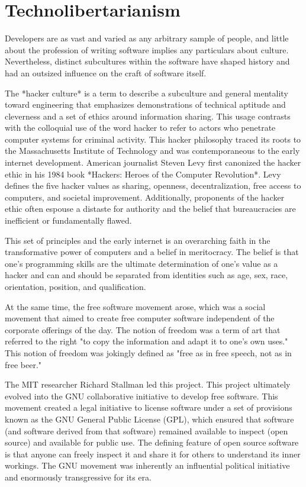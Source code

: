 \section{Technolibertarianism}

Developers are as vast and varied as any arbitrary sample of people, and little
about the profession of writing software implies any particulars about culture.
Nevertheless, distinct subcultures within the software have shaped history and
had an outsized influence on the craft of software itself.

The *hacker culture* is a term to describe a subculture and general mentality
toward engineering that emphasizes demonstrations of technical aptitude and
cleverness and a set of ethics around information sharing. This usage contrasts
with the colloquial use of the word hacker to refer to actors who penetrate
computer systems for criminal activity. This hacker philosophy traced its roots
to the Massachusetts Institute of Technology and was contemporaneous to the
early internet development. American journalist Steven Levy first canonized the
hacker ethic in his 1984 book *Hackers: Heroes of the Computer Revolution*. Levy
defines the five hacker values as sharing, openness, decentralization, free
access to computers, and societal improvement. Additionally, proponents of the
hacker ethic often espouse a distaste for authority and the belief that
bureaucracies are inefficient or fundamentally flawed.

This set of principles and the early internet is an overarching faith in the
transformative power of computers and a belief in meritocracy. The belief is
that one's programming skills are the ultimate determination of one's value as a
hacker and can and should be separated from identities such as age, sex, race,
orientation, position, and qualification.

At the same time, the free software movement arose, which was a social movement
that aimed to create free computer software independent of the corporate
offerings of the day. The notion of freedom was a term of art that referred to
the right "to copy the information and adapt it to one's own uses." This notion
of freedom was jokingly defined as "free as in free speech, not as in free
beer."

The MIT researcher Richard Stallman led this project. This project ultimately
evolved into the GNU collaborative initiative to develop free software. This
movement created a legal initiative to license software under a set of
provisions known as the GNU General Public License (GPL), which ensured that
software (and software derived from that software) remained available to inspect
(open source) and available for public use. The defining feature of open source
software is that anyone can freely inspect it and share it for others to
understand its inner workings. The GNU movement was inherently an influential
political initiative and enormously transgressive for its era.

